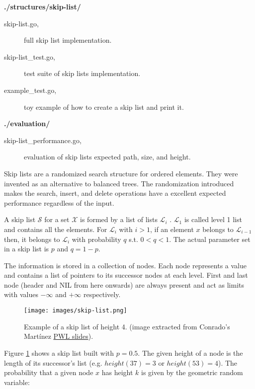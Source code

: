 \documentclass[a4paper,10pt,table,xcdraw]{article}
\begin{document}
\textbf{./structures/skip-list/}
\begin{description}
\item [\hspace{10mm} skip-list.go,] full skip list implementation.
\item [\hspace{10mm} skip-list\_test.go,] test suite of skip lists implementation.
\item [\hspace{10mm} example\_test.go,] toy example of how to create a skip list and print it.
\end{description}
\textbf{./evaluation/}
\begin{description}
\item [\hspace{10mm} skip-list\_performance.go,] evaluation of skip lists expected path, size, and height.
\end{description}

Skip lists \cite{Pugh1990} are a randomized search structure for ordered elements. They were invented as an alternative to balanced trees. The randomization introduced makes the search, insert, and delete operations have a excellent expected performance regardless of the input.

A skip list $\mathcal{S}$ for a set $\mathcal{X}$ is formed by a list of lists $\mathcal{L}_i$ . $\mathcal{L}_1$ is called level 1 list and contains all the elements. For $\mathcal{L}_i$ with $i > 1$, if an element $x$ belongs to  $\mathcal{L}_{i-1}$ then, it belongs to $\mathcal{L}_i$ with probability $q$ s.t. $0 < q < 1$. The actual parameter set in a skip list is $p$ and $q = 1 - p$.

The information is stored in a collection of nodes. Each node represents a value and contains a list of pointers to its successor nodes at each level. First and last node (header and NIL from here onwards) are always present and act as limits with values $- \infty$ and $+ \infty$ respectively.

\begin{figure}[h]
\centering
\texttt{[image: images/skip-list.png]}
\caption{Example of a skip list of height 4. (image extracted from  Conrado's Martínez \href{https://drive.google.com/file/d/0B2Eb2dCEJBHQNHNGcDhLNjAwZ3Bnck1tU3JaR1lRcHM1U1pv/view}{PWL slides}).}
\label{fig:skip-list}
\end{figure}

Figure \ref{fig:skip-list} shows a skip list built with $p=0.5$. The given height of a node is the length of its successor's list (e.g. $height(37) = 3$ or $height(53)=4$). The probability that a given node $x$ has height $k$ is given by the geometric random variable:
\end{document}
